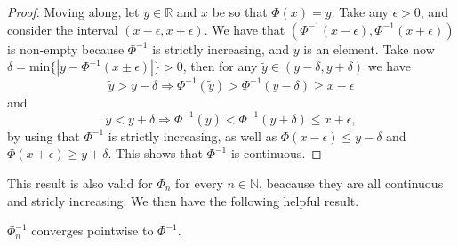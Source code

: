 \documentclass[11pt, a4paper]{article}
\begin{document}
\begin{appendix}
\begin{proof}
Moving along, let $y \in \mathbb{R}$ and $x$ be so that $\Phi(x) = y$. Take any $\epsilon > 0$, and consider the interval $(x-\epsilon, x + \epsilon)$. We have that $(\Phi^{-1}(x-\epsilon), \Phi^{-1}(x+\epsilon))$ is non-empty because $\Phi^{-1}$ is strictly increasing, and $y$ is an element. Take now $\delta = \mathrm{min}\{ |y-\Phi^{-1}(x\pm\epsilon)|\} >0$, then for any $\tilde{y} \in (y-\delta, y + \delta)$ we have
\begin{equation*}
\tilde{y} > y-\delta \Rightarrow \Phi^{-1}(\tilde{y}) > \Phi^{-1}(y-\delta) \geq x-\epsilon
\end{equation*}
and
\begin{equation*}
\tilde{y} < y+\delta \Rightarrow \Phi^{-1}(\tilde{y}) < \Phi^{-1}(y+\delta) \leq x+\epsilon,
\end{equation*}
by using that $\Phi^{-1}$ is strictly increasing, as well as $\Phi(x-\epsilon) \leq y-\delta$ and $\Phi(x+\epsilon) \geq y + \delta$. This shows that $\Phi^{-1}$ is continuous.
\end{proof}

This result is also valid for $\Phi_n$ for every $n \in \mathbb{N}$, beacause they are all continuous and stricly increasing. We then have the following helpful result.

\begin{proposition}
$\Phi_n^{-1}$ converges pointwise to $\Phi^{-1}$.
\end{proposition}


\end{appendix}
\end{document}
